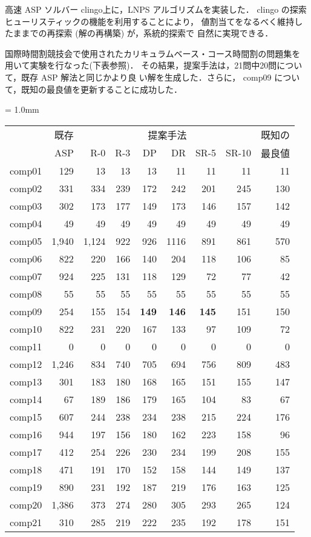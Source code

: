\documentclass[a4j,10pt]{jarticle}
\newcommand{\lw}[1]{\smash{\lower2.ex\hbox{#1}}} %
\begin{document}
\begin{multicols}{1}
高速 ASP ソルバー \textsf{clingo}上に，LNPS アルゴリズムを実装した．
\textsf{clingo} の探索ヒューリスティックの機能を利用することにより，
値割当てをなるべく維持したままでの再探索 (解の再構築) が，系統的探索で
自然に実現できる．

国際時間割競技会で使用されたカリキュラムベース・コース時間割の問題集を
用いて実験を行なった(下表参照)．
その結果，提案手法は，21問中20問について，既存 ASP 解法と同じかより良
い解を生成した．さらに，
comp09 について，既知の最良値を更新することに成功した．

\begin{center}\footnotesize
\renewcommand{\arraystretch}{1.2}
\tabcolsep = 1.0mm
\begin{tabular}{c|r|rrrrrr|r}
\lw{問題名} & 既存 & \multicolumn{6}{c|}{提案手法} & 既知の\\
       & ASP  & R-0 & R-3 & DP & DR & SR-5 & SR-10 & 最良値\\\hline
comp01 & 129 & 13 & 13 & 13 & 11 & 11 & 11 & 11\\
comp02 & 331 & 334 & 239 &172 & 242 & 201 & 245 & 130\\
comp03 & 302 & 173 & 177 & 149 & 173 & 146 & 157 & 142\\
comp04 & 49 & 49 & 49 & 49 & 49 & 49 & 49 & 49\\
comp05 & 1,940 & 1,124 & 922 & 926 & 1116 & 891 & 861 & 570\\
comp06 & 822 & 220 & 166 & 140 & 204 & 118 & 106 & 85\\
comp07 & 924 & 225 & 131 & 118 & 129 & 72 & 77 & 42\\
comp08 & 55 & 55 & 55 & 55 & 55 & 55 & 55 & 55\\
comp09 & 254 & 155 & 154 & \textbf{149} & \textbf{146} & \textbf{145} & 151 & 150\\
comp10 & 822 & 231 & 220 & 167 & 133 & 97 & 109 & 72\\
comp11 & 0 & 0 & 0 & 0 & 0 & 0 & 0 & 0\\
comp12 & 1,246 & 834 & 740 & 705 & 694 & 756 & 809 & 483\\
comp13 & 301 & 183 & 180 & 168 & 165 & 151 & 155 & 147\\
comp14 & 67 & 189 & 186 & 179 & 165 & 104 & 83 & 67\\
comp15 & 607 & 244 & 238 & 234 & 238 & 215 & 224 & 176\\
comp16 & 944 & 197 & 156 & 180 & 162 & 223 & 158 & 96\\
comp17 & 412 & 254 & 226 & 230 & 234 & 199 & 208 & 155\\
comp18 & 471 & 191 & 170 & 152 & 158 & 144 & 149 & 137\\
comp19 & 890 & 231 & 192 & 187 & 219 & 176 & 163 & 125\\
comp20 & 1,386 & 373 & 274 & 280 & 305 & 293 & 265 & 124\\
comp21 & 310 & 285 & 219 & 222 & 235 & 192 & 178 & 151\\\hline
\end{tabular}
\end{center}


\end{multicols}
\end{document}
